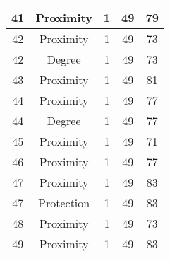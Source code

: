 \documentclass[results.tex]{subfiles}
\begin{document}
\begin{center}
\begin{tabular}{| c || c | c | c | c |}
            \hline
            41                      & Proximity                    & 1                      & 49                      & 79                   \\
            \hline
            42                      & Proximity                    & 1                      & 49                      & 73                   \\
            \hline
            42                      & Degree                       & 1                      & 49                      & 73                   \\
            \hline
            43                      & Proximity                    & 1                      & 49                      & 81                   \\
            \hline
            44                      & Proximity                    & 1                      & 49                      & 77                   \\
            \hline
            44                      & Degree                       & 1                      & 49                      & 77                   \\
            \hline
            45                      & Proximity                    & 1                      & 49                      & 71                   \\
            \hline
            46                      & Proximity                    & 1                      & 49                      & 77                   \\
            \hline
            47                      & Proximity                    & 1                      & 49                      & 83                   \\
            \hline
            47                      & Protection                   & 1                      & 49                      & 83                   \\
            \hline
            48                      & Proximity                    & 1                      & 49                      & 73                   \\
            \hline
            49                      & Proximity                    & 1                      & 49                      & 83                   \\
            \hline
        \end{tabular}
    \end{center}
\end{document}
